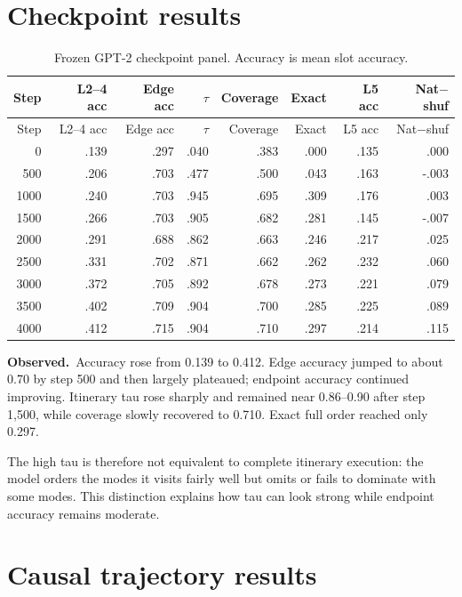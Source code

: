 \documentclass[10pt]{article}
\newcommand{\obs}{\textbf{Observed.}\ }
\begin{document}
\section{Checkpoint results}

\begin{longtable}{rrrrrrrr}
\caption{Frozen GPT-2 checkpoint panel. Accuracy is mean slot accuracy.}\\
\toprule
Step & L2--4 acc & Edge acc & $\tau$ & Coverage & Exact & L5 acc & Nat$-$shuf \\
\midrule
\endfirsthead
\toprule
Step & L2--4 acc & Edge acc & $\tau$ & Coverage & Exact & L5 acc & Nat$-$shuf \\
\midrule
\endhead
0    & .139 & .297 & .040 & .383 & .000 & .135 & .000 \\
500  & .206 & .703 & .477 & .500 & .043 & .163 & -.003 \\
1000 & .240 & .703 & .945 & .695 & .309 & .176 & .003 \\
1500 & .266 & .703 & .905 & .682 & .281 & .145 & -.007 \\
2000 & .291 & .688 & .862 & .663 & .246 & .217 & .025 \\
2500 & .331 & .702 & .871 & .662 & .262 & .232 & .060 \\
3000 & .372 & .705 & .892 & .678 & .273 & .221 & .079 \\
3500 & .402 & .709 & .904 & .700 & .285 & .225 & .089 \\
4000 & .412 & .715 & .904 & .710 & .297 & .214 & .115 \\
\bottomrule
\end{longtable}

\obs Accuracy rose from 0.139 to 0.412. Edge accuracy jumped to about 0.70 by
step 500 and then largely plateaued; endpoint accuracy continued improving.
Itinerary tau rose sharply and remained near 0.86--0.90 after step 1,500, while
coverage slowly recovered to 0.710. Exact full order reached only 0.297.

The high tau is therefore not equivalent to complete itinerary execution: the
model orders the modes it visits fairly well but omits or fails to dominate with
some modes. This distinction explains how tau can look strong while endpoint
accuracy remains moderate.

\section{Causal trajectory results}
\end{document}
